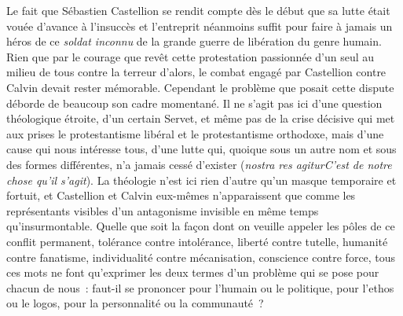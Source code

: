 \documentclass[french,twoside]{book} %
\newcommand\foreign[1]{\emph{#1}}
\begin{document}
Le fait que Sébastien Castellion se rendit compte dès le début que sa lutte était vouée d’avance à l’insuccès et l’entreprit néanmoins suffit pour faire à jamais un héros de ce \emph{soldat inconnu} de la grande guerre de libération du genre humain. Rien que par le courage que revêt cette protestation passionnée d’un seul au milieu de tous contre la terreur d’alors, le combat engagé par Castellion contre Calvin devait rester mémorable. Cependant le problème que posait cette dispute déborde de beaucoup son cadre momentané. Il ne s’agit pas ici d’une question théologique étroite, d’un certain Servet, et même pas de la crise décisive qui met aux prises le protestantisme libéral et le protestantisme orthodoxe, mais d’une cause qui nous intéresse tous, d’une lutte qui, quoique sous un autre nom et sous des formes différentes, n’a jamais cessé d’exister (\foreign{nostra res agiturC’est de \emph{notre chose} qu’il s’\emph{agit}}). La théologie n’est ici rien d’autre qu’un masque temporaire et fortuit, et Castellion et Calvin eux-mêmes n’apparaissent que comme les représentants visibles d’un antagonisme invisible en même temps qu’insurmontable. Quelle que soit la façon dont on veuille appeler les pôles de ce conflit permanent, tolérance contre intolérance, liberté contre tutelle, humanité contre fanatisme, individualité contre mécanisation, conscience contre force, tous ces mots ne font qu’exprimer les deux termes d’un problème qui se pose pour chacun de nous : faut-il se prononcer pour l’humain ou le politique, pour l’ethos ou le logos, pour la personnalité ou la communauté ?\par
\end{document}
